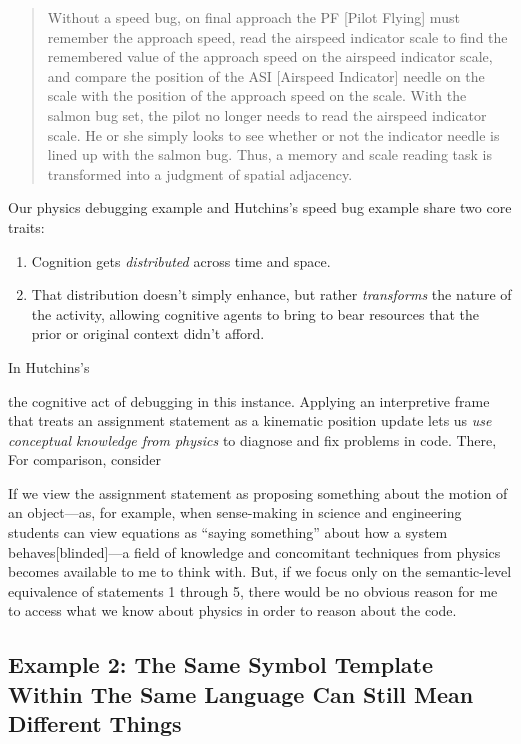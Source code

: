 \begin{quote}
  Without a speed bug, on final approach the PF [Pilot Flying] must remember the approach speed, read the airspeed indicator scale to find the remembered value of the approach speed on the airspeed indicator scale, and compare the position of the ASI [Airspeed Indicator] needle on the scale with the position of the approach speed on the scale. With the salmon bug set, the pilot no longer needs to read the airspeed indicator scale. He or she simply looks to see whether or not the indicator needle is lined up with the salmon bug. Thus, a memory and scale reading task is transformed into a judgment of spatial adjacency. \cite{hutchins_how_1995}
\end{quote}

Our physics debugging example and Hutchins's speed bug example \cite{hutchins_how_1995} share two core traits:

\begin{enumerate}
  \tightlist
  \item Cognition gets \emph{distributed} \cite{hutchins_distributed_2000,hutchins_cognition_1995} across time and space.
  \item That distribution doesn't simply enhance, but rather \emph{transforms} the nature of the activity, allowing cognitive agents to bring to bear resources that the prior or original context didn't afford.
\end{enumerate}

In Hutchins's

the cognitive act of debugging in this instance. Applying an interpretive frame that
treats an assignment statement as a kinematic position update lets us
\emph{use conceptual knowledge from physics} to diagnose and fix
problems in code.   There,  For comparison, consider

 If we view the assignment statement as proposing
something about the motion of an object---as, for example, when sense-making in science and engineering students can view equations as ``saying something'' about how a system behaves[blinded]---a
field of knowledge and concomitant techniques from physics becomes
available to me to think with. But, if we focus only on the
semantic-level equivalence of statements 1 through 5, there would be no
obvious reason for me to access what we know about physics in order to
reason about the code.

\subsection{Example 2: The Same Symbol Template Within The Same Language Can Still Mean Different Things}

